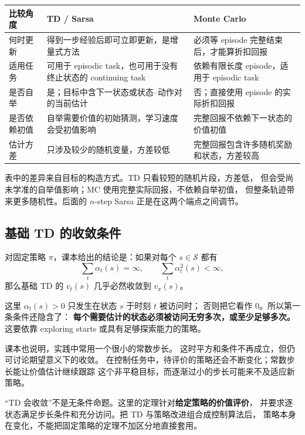 \documentclass[11pt,a4paper,fontset=fandol]{ctexart}
\newcommand{\Sset}{\mathcal{S}}
\begin{document}
\begin{center}
\small
\begin{tabularx}{\textwidth}{
  >{\raggedright\arraybackslash}p{}
  >{\raggedright\arraybackslash}p{}
  X}
\toprule
比较角度 & TD / Sarsa & Monte Carlo\\
\midrule
何时更新 &
得到一步经验后即可立即更新，是增量式方法 &
必须等 episode 完整结束后，才能算折扣回报\\
适用任务 &
可用于 episodic task，也可用于没有终止状态的 continuing task &
依赖有限长度 episode，适用于 episodic task\\
是否自举 &
是；目标中含下一状态或状态--动作对的当前估计 &
否；直接使用 episode 的实际折扣回报\\
是否依赖初值 &
自举需要价值的初始猜测，学习速度会受初值影响 &
完整回报不依赖下一状态的价值初值\\
估计方差 &
只涉及较少的随机变量，方差较低 &
完整回报包含许多随机奖励和状态，方差较高\\
\bottomrule
\end{tabularx}
\end{center}

\begin{intuitionbox}[不是“TD 永远优于 MC”]
表中的差异来自目标的构造方式。TD 只看较短的随机片段，方差低，
但会受尚未学准的自举值影响；MC 使用完整实际回报，不依赖自举初值，
但整条轨迹带来更多随机性。后面的 \(n\)-step Sarsa
正是在这两个端点之间调节。
\end{intuitionbox}

\subsection{基础 TD 的收敛条件}

对固定策略 \(\pi\)，课本给出的结论是：如果对每个 \(s\in\Sset\) 都有
\[
\sum_t\alpha_t(s)=\infty,
\qquad
\sum_t\alpha_t^2(s)<\infty,
\]
那么基础 TD 的 \(v_t(s)\) 几乎必然收敛到 \(v_\pi(s)\)。

这里 \(\alpha_t(s)>0\) 只发生在状态 \(s\) 于时刻 \(t\) 被访问时；
否则把它看作 \(0\)。所以第一条条件还隐含了：
\textbf{每个需要估计的状态必须被访问无穷多次，或至少足够多次。}
这要依靠 exploring starts 或具有足够探索能力的策略。

课本也说明，实践中常用一个很小的常数步长。
这时平方和条件不再成立，但仍可讨论期望意义下的收敛。
在控制任务中，待评价的策略还会不断变化；常数步长能让价值估计继续跟踪
这个非平稳目标，而逐渐过小的步长可能来不及适应新策略。

\begin{warningbox}[收敛结论有前提]
“TD 会收敛”不是无条件命题。这里的定理针对\textbf{给定策略的价值评价}，
并要求逐状态满足步长条件和充分访问。把 TD 与策略改进组合成控制算法后，
策略本身在变化，不能把固定策略的定理不加区分地直接套用。
\end{warningbox}
\end{document}
